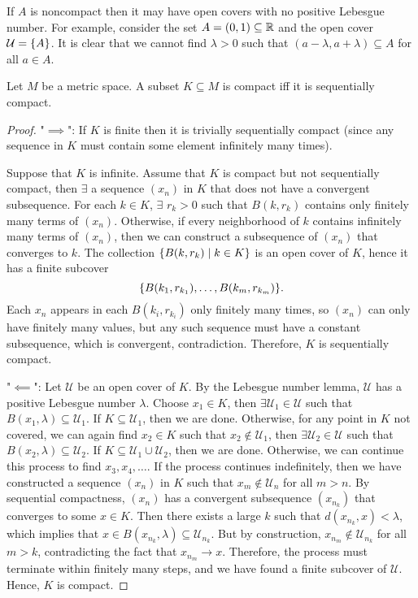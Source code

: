 If $A$ is noncompact then it may have open covers with no positive Lebesgue number. For example, consider the set $A = (0, 1) \subseteq {\mathbb R}$ and the open cover $\mathcal U = {\left\{{A}\right\}}$. It is clear that we cannot find $\lambda > 0$ such that $(a-\lambda, a+\lambda) \subseteq A$ for all $a\in A$.

\begin{thm}
    Let $M$ be a metric space. A subset $K\subseteq M$ is compact iff it is sequentially compact.
    \begin{proof}
        "$\implies$": If $K$ is finite then it is trivially sequentially compact (since any sequence in $K$ must contain some element infinitely many times). 
        
        Suppose that $K$ is infinite. Assume that $K$ is compact but not sequentially compact, then $\exists$ a sequence $(x_n)$ in $K$ that does not have a convergent subsequence. For each $k\in K$, $\exists$ $r_k > 0$ such that $B(k, r_k)$ contains only finitely many terms of $(x_n)$. Otherwise, if every neighborhood of $k$ contains infinitely many terms of $(x_n)$, then we can construct a subsequence of $(x_n)$ that converges to $k$. The collection ${\left\{{B(k, r_k) \mid k\in K}\right\}}$ is an open cover of $K$, hence it has a finite subcover
        \[
        {\left\{{B(k_1, r_{k_1}), \ldots, B(k_m, r_{k_m})}\right\}}.
        \]
        Each $x_n$ appears in each $B(k_i, r_{k_i})$ only finitely many times, so $(x_n)$ can only have finitely many values, but any such sequence must have a constant subsequence, which is convergent, contradiction. Therefore, $K$ is sequentially compact.

        "$\impliedby$": Let $\mathcal U$ be an open cover of $K$. By the Lebesgue number lemma, $\mathcal U$ has a positive Lebesgue number $\lambda$. Choose $x_1 \in K$, then $\exists \mathcal U_1 \in \mathcal U$ such that $B(x_1, \lambda) \subseteq \mathcal U_1$. If $K \subseteq \mathcal U_1$, then we are done. Otherwise, for any point in $K$ not covered, we can again find $x_2 \in K$ such that $x_2 \notin \mathcal U_1$, then $\exists \mathcal U_2 \in \mathcal U$ such that $B(x_2, \lambda) \subseteq \mathcal U_2$. If $K \subseteq \mathcal U_1 \cup \mathcal U_2$, then we are done. Otherwise, we can continue this process to find $x_3, x_4, \ldots$. If the process continues indefinitely, then we have constructed a sequence $(x_n)$ in $K$ such that $x_m \notin \mathcal U_n$ for all $m > n$. By sequential compactness, $(x_n)$ has a convergent subsequence $(x_{n_k})$ that converges to some $x\in K$. Then there exists a large $k$ such that $d(x_{n_k}, x) < \lambda$, which implies that $x\in B(x_{n_k}, \lambda)\subseteq \mathcal U_{n_k}$. But by construction, $x_{n_m} \notin \mathcal U_{n_k}$ for all $m > k$, contradicting the fact that $x_{n_m} \to x$. Therefore, the process must terminate within finitely many steps, and we have found a finite subcover of $\mathcal U$. Hence, $K$ is compact.
    \end{proof}
\end{thm}

